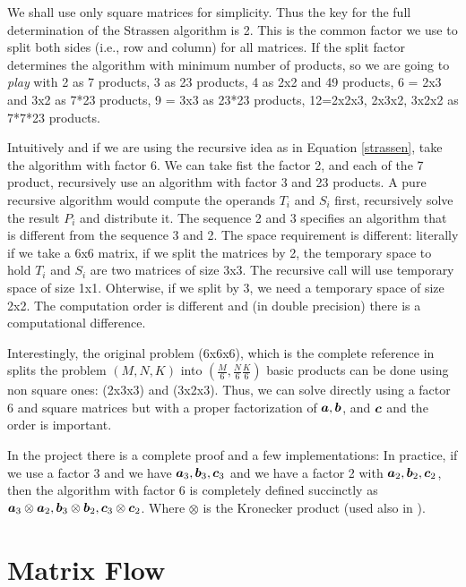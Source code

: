 \documentclass[acmsmall]{acmart}
\begin{document}
We shall use only square matrices for simplicity. Thus the key for the
full determination of the Strassen algorithm is 2. This is the common
factor we use to split both sides (i.e., row and column) for all
matrices. If the split factor determines the algorithm with minimum
number of products, so we are going to {\em play} with 2 as 7
products, 3 as 23 products, 4 as 2x2 and 49 products, 6 = 2x3 and 3x2
as 7*23 products, 9 = 3x3 as 23*23 products, 12=2x2x3, 2x3x2, 3x2x2 as
7*7*23 products.

Intuitively and if we are using the recursive idea as in Equation
\ref{strassen}, take the algorithm with factor 6. We can take fist the
factor 2, and each of the 7 product, recursively use an algorithm with
factor 3 and 23 products. A pure recursive algorithm would compute the
operands $T_i$ and $S_i$ first, recursively solve the result $P_i$ and
distribute it. The sequence 2 and 3 specifies an algorithm that is
different from the sequence 3 and 2.  The space requirement is
different: literally if we take a 6x6 matrix, if we split the matrices
by 2, the temporary space to hold $T_i$ and $S_i$ are two matrices of
size 3x3. The recursive call will use temporary space of size
1x1. Ohterwise, if we split by 3, we need a temporary space of size
2x2. The computation order is different and (in double precision)
there is a computational difference.

Interestingly, the original problem (6x6x6), which is the complete
reference in \cite{PMID:36198780} splits the problem $(M,N,K)$ into
$(\frac{M}{6},\frac{N}{6}\frac{K}{6})$ basic products can be done
using non square ones: (2x3x3) and (3x2x3). Thus, we can solve
directly using a factor 6 and square matrices but with a proper
factorization of ${\boldsymbol a},{\boldsymbol b}$, and ${\boldsymbol c}$ and the order is
important.

In the project there is a complete proof and a few implementations: In
practice, if we use a factor 3 and we have ${\boldsymbol a}_3, {\boldsymbol b}_3,
{\boldsymbol c}_3$ and we have a factor 2 with ${\boldsymbol a}_2, {\boldsymbol b}_2, {\boldsymbol c}_2$,
then the algorithm with factor 6 is completely defined succinctly as
${\boldsymbol a}_3 \otimes {\boldsymbol a}_2, {\boldsymbol b}_3 \otimes {\boldsymbol b}_2, {\boldsymbol c}_3
\otimes {\boldsymbol c}_2$. Where $\otimes$ is the Kronecker product (used also
in \cite{PMID:36198780}).

\section{Matrix Flow}






%

 

%
\end{document}
